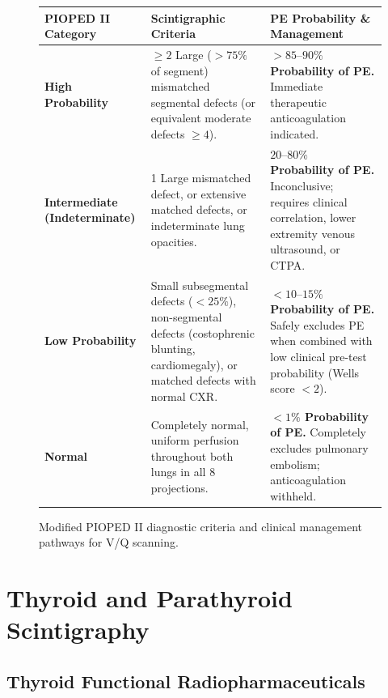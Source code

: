 \documentclass[11pt,a4paper]{article}
\begin{document}
\begin{figure}[htbp]
\centering
\setlength{\tabcolsep}{4pt}
\begin{tabular}{p{3.5cm}p{5.6cm}p{5.6cm}}
\toprule
\textbf{PIOPED II Category} & \textbf{Scintigraphic Criteria} & \textbf{PE Probability \& Management} \\
\midrule
\textbf{High Probability} & $\ge 2$ Large ($> 75\%$ of segment) mismatched segmental defects (or equivalent moderate defects $\ge 4$). & \textbf{$> 85\text{--}90\%$ Probability of PE.} Immediate therapeutic anticoagulation indicated. \\
\addlinespace
\textbf{Intermediate (Indeterminate)} & 1 Large mismatched defect, or extensive matched defects, or indeterminate lung opacities. & \textbf{$20\text{--}80\%$ Probability of PE.} Inconclusive; requires clinical correlation, lower extremity venous ultrasound, or CTPA. \\
\addlinespace
\textbf{Low Probability} & Small subsegmental defects ($< 25\%$), non-segmental defects (costophrenic blunting, cardiomegaly), or matched defects with normal CXR. & \textbf{$< 10\text{--}15\%$ Probability of PE.} Safely excludes PE when combined with low clinical pre-test probability (Wells score $< 2$). \\
\addlinespace
\textbf{Normal} & Completely normal, uniform perfusion throughout both lungs in all 8 projections. & \textbf{$< 1\%$ Probability of PE.} Completely excludes pulmonary embolism; anticoagulation withheld. \\
\bottomrule
\end{tabular}
\caption{Modified PIOPED II diagnostic criteria and clinical management pathways for V/Q scanning.}
\label{tab:pioped}
\end{figure}

\newpage
\section{Thyroid and Parathyroid Scintigraphy}

\subsection{Thyroid Functional Radiopharmaceuticals}
\end{document}
